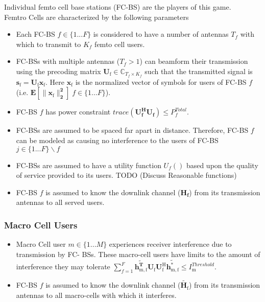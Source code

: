\documentclass[12pt]{article}
\begin{document}
Individual femto cell base stations (FC-BS) are the players of this game.
\\
Femtro Cells are characterized by the following parameters
\begin{itemize}
\item 
	Each FC-BS  $f \in \{1 ... F\}$ is considered to have a number of antennas $T_f$ with which to transmit to $K_f$ femto cell users.
\\
\item 
	FC-BSs with multiple antennas ($T_f >1$) can beamform their transmission using the precoding 	
	matrix $\mathbf{U_{\mathrm{f}}} \in \mathbb{C}_{T_f \times K_f}$ such that the transmitted 		
	signal is $\mathbf{s_{\mathrm{f}
	}}= \mathbf{U_{\mathrm{f}}}\mathbf{x_{\mathrm{f}}}$. Here $\mathbf{x_{\mathrm{f}}}$ is the 		
	normalized vector of symbols for users of FC-BS $f$ (i.e. $\mathbf{E[\|\mathbf{x_{\mathrm{f}}}	
	\|_2^2]} \; f \in \{1 ... F\}$).
\\
\item 
	FC-BS $f$ has power constraint $trace(\mathbf{U_f^H}\mathbf{U_f}) \leq P^{Total}_{f} $.
\\
\item
	 FC-BSs are assumed to be spaced far apart in distance. Therefore, FC-BS $f$ can be modeled as 
	 causing no interference to the users of FC-BS $j \in \{1 ... F\}\backslash f$
\item 
	FC-BSs are assumed to have a utility function $U_f()$ based upon the quality of service 		
	provided to its users. TODO (Discuss Reasonable functions)
\\
\item 
	FC-BS $f$ is assumed to know the downlink channel ($\mathbf{H_f}$) from its transmission 		
	antennas to all served users.
\\
\end{itemize}

\subsubsection{Macro Cell Users}

\begin{itemize}
\item 
	Macro Cell user $m \in \{1 ... M\}$ experiences receiver interference due to transmission by
	FC-	BSs. These macro-cell users have limits to the amount of interference they may tolerate 
	$\sum^F_{f=1} \mathbf{\tilde{h_{\mathrm{m,f}}^T}}  \mathbf{U_{\mathrm{f}}} 						
	\mathbf{U_{\mathrm{f}}^{\mathrm{H}}} \mathbf{\tilde{h_{\mathrm{m,f}}^*}} \leq I^{Threshold}		
	_{\mathrm{m}} $.

\item 
	FC-BS $f$ is assumed to know the downlink channel ($\tilde{\mathbf{H}_{\mathrm{f}}}$) from its
	transmission antennas to all macro-cells with which it interferes.
\\
\end{itemize}
\end{document}
